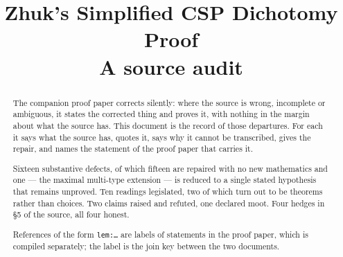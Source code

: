\documentclass[11pt]{article}
\title{Zhuk's Simplified CSP Dichotomy Proof\\[2pt]
  \large A source audit}
\author{}\date{}
\begin{document}
\maketitle\vspace{-2.2em}
\begin{abstract}
The companion proof paper corrects \cite{ZhukSimplified} silently: where the
source is wrong, incomplete or ambiguous, it states the corrected thing and
proves it, with nothing in the margin about what the source has. This document
is the record of those departures. For each it says what the source has, quotes
it, says why it cannot be transcribed, gives the repair, and names the
statement of the proof paper that carries it.

Sixteen substantive defects, of which fifteen are repaired with no new
mathematics and one --- the maximal multi-type extension --- is reduced to a
single stated hypothesis that remains unproved. Ten
readings legislated, two of which turn out to be theorems rather than choices.
Two claims raised and refuted, one declared moot. Four hedges in \S5 of the
source, all four honest.

References of the form \texttt{lem:\dots} are labels of statements in the proof
paper, which is compiled separately; the label is the join key between the two
documents.
\end{abstract}

\tableofcontents\clearpage


\clearpage

\clearpage

\clearpage

\clearpage


\clearpage

\end{document}
